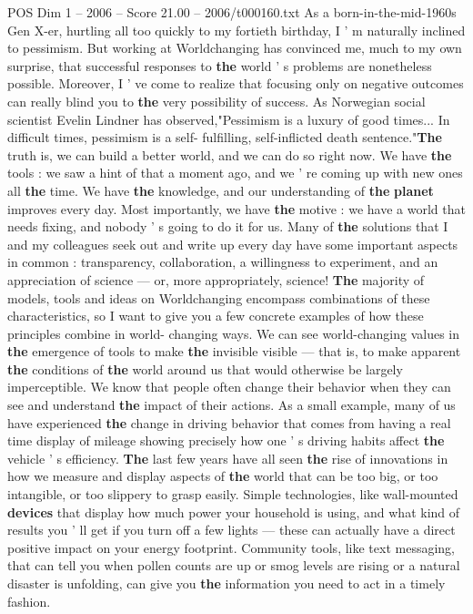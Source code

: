 \begin{textsample}{POS Dim 1 – 2006 – Score 21.00 – 2006/t000160.txt}
As a born-in-the-mid-1960s Gen X-er, hurtling all too quickly to my fortieth birthday, I ' m naturally inclined to pessimism.
But working at Worldchanging has convinced me, much to my own surprise, that successful responses to \textbf{the} world ' s problems are nonetheless possible.
Moreover, I ' ve come to realize that focusing only on negative outcomes can really blind you to \textbf{the} very possibility of success.
As Norwegian social scientist Evelin Lindner has observed,"Pessimism is a luxury of good times...
In difficult times, pessimism is a self- fulfilling, self-inflicted death sentence."\textbf{The} truth is, we can build a better world, and we can do so right now.
We have \textbf{the} tools : we saw a hint of that a moment ago, and we ' re coming up with new ones all \textbf{the} time.
We have \textbf{the} knowledge, and our understanding of \textbf{the} \textbf{planet} improves every day.
Most importantly, we have \textbf{the} motive : we have a world that needs fixing, and nobody ' s going to do it for us.
Many of \textbf{the} solutions that I and my colleagues seek out and write up every day have some important aspects in common : transparency, collaboration, a willingness to experiment, and an appreciation of science — or, more appropriately, science! \textbf{The} majority of models, tools and ideas on Worldchanging encompass combinations of these characteristics, so I want to give you a few concrete examples of how these principles combine in world- changing ways.
We can see world-changing values in \textbf{the} emergence of tools to make \textbf{the} invisible visible — that is, to make apparent \textbf{the} conditions of \textbf{the} world around us that would otherwise be largely imperceptible.
We know that people often change their behavior when they can see and understand \textbf{the} impact of their actions.
As a small example, many of us have experienced \textbf{the} change in driving behavior that comes from having a real time display of mileage showing precisely how one ' s driving habits affect \textbf{the} vehicle ' s efficiency. \textbf{The} last few years have all seen \textbf{the} rise of innovations in how we measure and display aspects of \textbf{the} world that can be too big, or too intangible, or too slippery to grasp easily.
Simple technologies, like wall-mounted \textbf{devices} that display how much power your household is using, and what kind of results you ' ll get if you turn off a few lights — these can actually have a direct positive impact on your energy footprint.
Community tools, like text messaging, that can tell you when pollen counts are up or smog levels are rising or a natural disaster is unfolding, can give you \textbf{the} information you need to act in a timely fashion.

\end{textsample}
